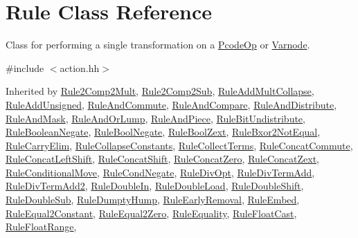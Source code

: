 \hypertarget{class_rule}{}\section{Rule Class Reference}
\label{class_rule}


Class for performing a single transformation on a \mbox{\hyperlink{class_pcode_op}{Pcode\+Op}} or \mbox{\hyperlink{class_varnode}{Varnode}}.  




{\ttfamily \#include $<$action.\+hh$>$}



Inherited by \mbox{\hyperlink{class_rule2_comp2_mult}{Rule2\+Comp2\+Mult}}, \mbox{\hyperlink{class_rule2_comp2_sub}{Rule2\+Comp2\+Sub}}, \mbox{\hyperlink{class_rule_add_mult_collapse}{Rule\+Add\+Mult\+Collapse}}, \mbox{\hyperlink{class_rule_add_unsigned}{Rule\+Add\+Unsigned}}, \mbox{\hyperlink{class_rule_and_commute}{Rule\+And\+Commute}}, \mbox{\hyperlink{class_rule_and_compare}{Rule\+And\+Compare}}, \mbox{\hyperlink{class_rule_and_distribute}{Rule\+And\+Distribute}}, \mbox{\hyperlink{class_rule_and_mask}{Rule\+And\+Mask}}, \mbox{\hyperlink{class_rule_and_or_lump}{Rule\+And\+Or\+Lump}}, \mbox{\hyperlink{class_rule_and_piece}{Rule\+And\+Piece}}, \mbox{\hyperlink{class_rule_bit_undistribute}{Rule\+Bit\+Undistribute}}, \mbox{\hyperlink{class_rule_boolean_negate}{Rule\+Boolean\+Negate}}, \mbox{\hyperlink{class_rule_bool_negate}{Rule\+Bool\+Negate}}, \mbox{\hyperlink{class_rule_bool_zext}{Rule\+Bool\+Zext}}, \mbox{\hyperlink{class_rule_bxor2_not_equal}{Rule\+Bxor2\+Not\+Equal}}, \mbox{\hyperlink{class_rule_carry_elim}{Rule\+Carry\+Elim}}, \mbox{\hyperlink{class_rule_collapse_constants}{Rule\+Collapse\+Constants}}, \mbox{\hyperlink{class_rule_collect_terms}{Rule\+Collect\+Terms}}, \mbox{\hyperlink{class_rule_concat_commute}{Rule\+Concat\+Commute}}, \mbox{\hyperlink{class_rule_concat_left_shift}{Rule\+Concat\+Left\+Shift}}, \mbox{\hyperlink{class_rule_concat_shift}{Rule\+Concat\+Shift}}, \mbox{\hyperlink{class_rule_concat_zero}{Rule\+Concat\+Zero}}, \mbox{\hyperlink{class_rule_concat_zext}{Rule\+Concat\+Zext}}, \mbox{\hyperlink{class_rule_conditional_move}{Rule\+Conditional\+Move}}, \mbox{\hyperlink{class_rule_cond_negate}{Rule\+Cond\+Negate}}, \mbox{\hyperlink{class_rule_div_opt}{Rule\+Div\+Opt}}, \mbox{\hyperlink{class_rule_div_term_add}{Rule\+Div\+Term\+Add}}, \mbox{\hyperlink{class_rule_div_term_add2}{Rule\+Div\+Term\+Add2}}, \mbox{\hyperlink{class_rule_double_in}{Rule\+Double\+In}}, \mbox{\hyperlink{class_rule_double_load}{Rule\+Double\+Load}}, \mbox{\hyperlink{class_rule_double_shift}{Rule\+Double\+Shift}}, \mbox{\hyperlink{class_rule_double_sub}{Rule\+Double\+Sub}}, \mbox{\hyperlink{class_rule_dumpty_hump}{Rule\+Dumpty\+Hump}}, \mbox{\hyperlink{class_rule_early_removal}{Rule\+Early\+Removal}}, \mbox{\hyperlink{class_rule_embed}{Rule\+Embed}}, \mbox{\hyperlink{class_rule_equal2_constant}{Rule\+Equal2\+Constant}}, \mbox{\hyperlink{class_rule_equal2_zero}{Rule\+Equal2\+Zero}}, \mbox{\hyperlink{class_rule_equality}{Rule\+Equality}}, \mbox{\hyperlink{class_rule_float_cast}{Rule\+Float\+Cast}}, \mbox{\hyperlink{class_rule_float_range}{Rule\+Float\+Range}}, 